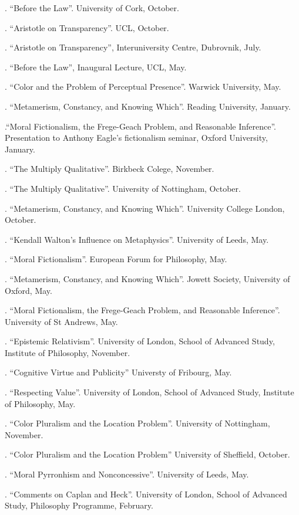 \documentclass[11pt]{article}
\begin{document}
. ``Before the Law''. University of Cork, October.

. ``Aristotle on Transparency''. UCL, October.

. ``Aristotle on Transparency'', Interuniversity Centre, Dubrovnik, July.

. ``Before the Law'', Inaugural Lecture, UCL, May.

.  ``Color and the Problem of Perceptual Presence''. Warwick University, May.

. ``Metamerism, Constancy, and Knowing Which''. Reading University, January.

.``Moral Fictionalism, the Frege-Geach Problem, and Reasonable Inference''. Presentation to Anthony Eagle's fictionalism seminar, Oxford University, January.

. ``The Multiply Qualitative''. Birkbeck Colege, November.

. ``The Multiply Qualitative''. University of Nottingham, October.

. ``Metamerism, Constancy, and Knowing Which''. University College London, October.

. ``Kendall Walton's Influence on Metaphysics''. University of Leeds, May.

. ``Moral Fictionalism''. European Forum for Philosophy, May.

. ``Metamerism, Constancy, and Knowing Which''. Jowett Society, University of Oxford, May.

. ``Moral Fictionalism, the Frege-Geach Problem, and Reasonable Inference''. University of St Andrews, May.

. ``Epistemic Relativism''. University of London, School of Advanced Study, Institute of Philosophy, November.

. ``Cognitive Virtue and Publicity'' Universty of Fribourg, May. 

. ``Respecting Value''. University of London, School of Advanced Study, Institute of Philosophy, May.

. ``Color Pluralism and the Location Problem''. University of Nottingham, November.

. ``Color Pluralism and the Location Problem'' University of Sheffield, October.

. ``Moral Pyrronhism and Nonconcessive''. University of Leeds, May.

. ``Comments on Caplan and Heck''. University of London, School of Advanced Study, Philosophy Programme, February.
\end{document}
